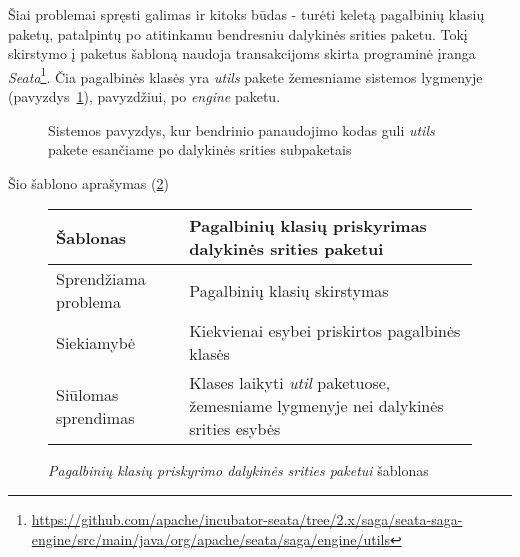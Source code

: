 Šiai problemai spręsti galimas ir kitoks būdas - turėti keletą pagalbinių klasių paketų, patalpintų po atitinkamu bendresniu dalykinės srities
 paketu.
Tokį skirstymo į paketus šabloną naudoja transakcijoms skirta programinė įranga \textit{Seata}\footnote{\url{https://github.com/apache/incubator-seata/tree/2.x/saga/seata-saga-engine/src/main/java/org/apache/seata/saga/engine/utils}}.
Čia pagalbinės klasės yra \textit{utils} pakete žemesniame sistemos lygmenyje (pavyzdys~\ref{fig:domainHelpers}), pavyzdžiui, po \textit{engine} paketu.
\begin{figure}[H]
    \snugshade
    \endsnugshade
    \caption{Sistemos pavyzdys, kur bendrinio panaudojimo kodas guli \textit{utils} pakete esančiame po dalykinės srities subpaketais}
    \label{fig:domainHelpers}
\end{figure}
Šio šablono aprašymas (\ref{table:domainHelper})
\begin{figure}[H]
\begin{center}
    \begin{tabular}{|p{5cm}|p{10cm}|}
        \hline
        Šablonas & Pagalbinių klasių priskyrimas dalykinės srities paketui \\ [0.5ex]
        \hline\hline
        Sprendžiama problema & Pagalbinių klasių skirstymas\\
        \hline
        Siekiamybė & Kiekvienai esybei priskirtos pagalbinės klasės\\
        \hline
        Siūlomas sprendimas & Klases laikyti \textit{util} paketuose, žemesniame lygmenyje nei dalykinės srities esybės \\
        \hline
    \end{tabular}
\end{center}
\caption{\textit{Pagalbinių klasių priskyrimo dalykinės srities paketui} šablonas}
\label{table:domainHelper}
\end{figure}

